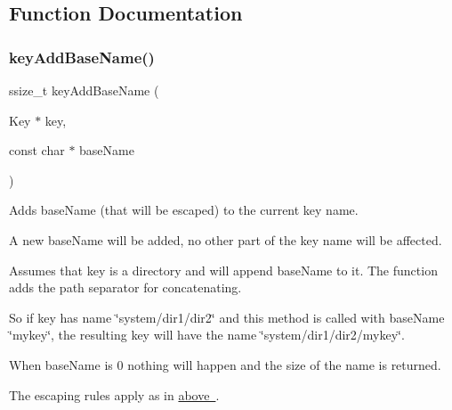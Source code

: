 \subsection{Function Documentation}
\mbox{\label{group__keyname_gaa942091fc4bd5c2699e49ddc50829524}} 
\subsubsection{\texorpdfstring{keyAddBaseName()}{keyAddBaseName()}}
{\footnotesize\ttfamily ssize\+\_\+t key\+Add\+Base\+Name (\begin{DoxyParamCaption}\item[{Key $\ast$}]{key,  }\item[{const char $\ast$}]{base\+Name }\end{DoxyParamCaption})}



Adds {\ttfamily base\+Name} (that will be escaped) to the current key name. 

A new base\+Name will be added, no other part of the key name will be affected.

Assumes that {\ttfamily key} is a directory and will append {\ttfamily base\+Name} to it. The function adds the path separator for concatenating.

So if {\ttfamily key} has name {\ttfamily \char`\"{}system/dir1/dir2\char`\"{}} and this method is called with {\ttfamily base\+Name} {\ttfamily \char`\"{}mykey\char`\"{}}, the resulting key will have the name {\ttfamily \char`\"{}system/dir1/dir2/mykey\char`\"{}}.

When {\ttfamily base\+Name} is 0 nothing will happen and the size of the name is returned.

The escaping rules apply as in \mbox{\hyperlink{group__keyname}{above }}.

